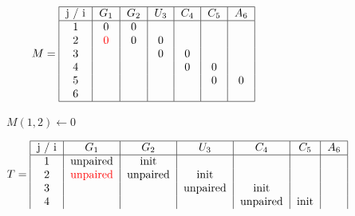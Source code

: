 \begin{figure}[H]
    \centering
    \begin{subfigure}[t]{0.25\textwidth}
        \scriptsize \[
                        M =  \begin{tabular}{|c|c|c|c|c|c|c|}
                                 \hline
                                 j / i & $G_1$              & $G_2$ & $U_3$ & $C_4$ & $C_5$ & $A_6$ \\ \hline
                                 1     & 0                  & 0     &       &       &       &       \\
                                 2     & \textcolor{red}{0} & 0     & 0     &       &       &       \\
                                 3     &                    &       & 0     & 0     &       &       \\
                                 4     &                    &       &       & 0     & 0     &       \\
                                 5     &                    &       &       &       & 0     & 0     \\
                                 6     &                    &       &       &       &       &       \\ \hline
                        \end{tabular}
        \]
        \caption{$M(1,2) \gets 0$}
    \end{subfigure}
    \hfill
    \begin{subfigure}[t]{0.65\textwidth}
        \scriptsize \[
                        T =     \begin{tabular}{|c|c|c|c|c|c|c|}
                                    \hline
                                    j / i & $G_1$                     & $G_2$    & $U_3$    & $C_4$    & $C_5$    & $A_6$ \\ \hline
                                    1     & unpaired                  & init     &          &          &          &       \\
                                    2     & \textcolor{red}{unpaired} & unpaired & init     &          &          &       \\
                                    3     &                           &          & unpaired & init     &          &       \\
                                    4     &                           &          &          & unpaired & init     &       \\

\end{tabular}\]
\end{subfigure}
\end{figure}
